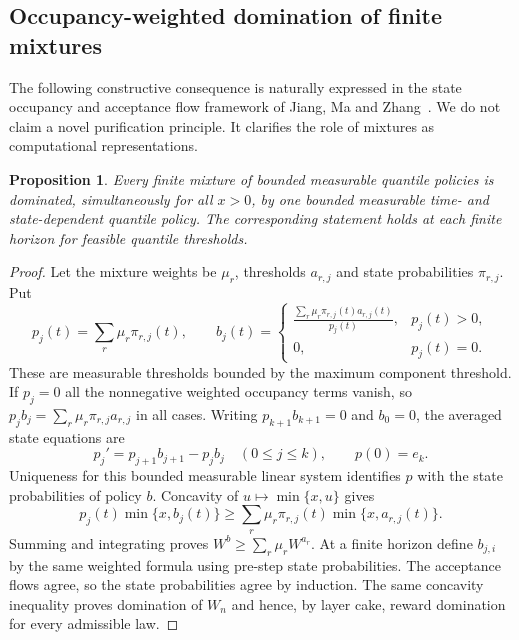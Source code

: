 \documentclass[11pt]{article}
\newtheorem{proposition}[theorem]{Proposition}
\theoremstyle{remark}
\begin{document}
\subsection{Occupancy-weighted domination of finite mixtures}

The following constructive consequence is naturally expressed in the
state occupancy and acceptance flow framework of Jiang, Ma and
Zhang~\cite{JMZ}. We do not claim a novel purification principle.
It clarifies the role of mixtures as computational representations.

\begin{proposition}\label{prop:general-k-occupancy-domination}
Every finite mixture of bounded measurable quantile policies is
dominated, simultaneously for all $x>0$, by one bounded measurable
time- and state-dependent quantile policy. The corresponding statement
holds at each finite horizon for feasible quantile thresholds.
\end{proposition}

\begin{proof}
Let the mixture weights be $\mu_r$, thresholds $a_{r,j}$ and state
probabilities $\pi_{r,j}$. Put
\[
 p_j(t)=\sum_r\mu_r\pi_{r,j}(t),\qquad
 b_j(t)=
 \begin{cases}
 \displaystyle\frac{\sum_r\mu_r\pi_{r,j}(t)a_{r,j}(t)}{p_j(t)},
       &p_j(t)>0,\\
 0,&p_j(t)=0.
 \end{cases}
\]
These are measurable thresholds bounded by the maximum component
threshold. If $p_j=0$ all the nonnegative weighted occupancy terms
vanish, so $p_jb_j=\sum_r\mu_r\pi_{r,j}a_{r,j}$ in all cases.
Writing $p_{k+1}b_{k+1}=0$ and $b_0=0$, the averaged state equations
are
\[
 p_j'=p_{j+1}b_{j+1}-p_jb_j\quad(0\le j\le k),
 \qquad p(0)=e_k.
\]
Uniqueness for this bounded measurable linear system identifies $p$
with the state probabilities of policy $b$. Concavity of
$u\mapsto\min\{x,u\}$ gives
\[
 p_j(t)\min\{x,b_j(t)\}
 \ge\sum_r\mu_r\pi_{r,j}(t)\min\{x,a_{r,j}(t)\}.
\]
Summing and integrating proves $W^b\ge\sum_r\mu_rW^{a_r}$.
At a finite horizon define $b_{j,i}$ by the same weighted formula
using pre-step state probabilities. The acceptance flows agree, so
the state probabilities agree by induction. The same concavity
inequality proves domination of $W_n$ and hence, by layer cake,
reward domination for every admissible law.
\end{proof}
\end{document}
